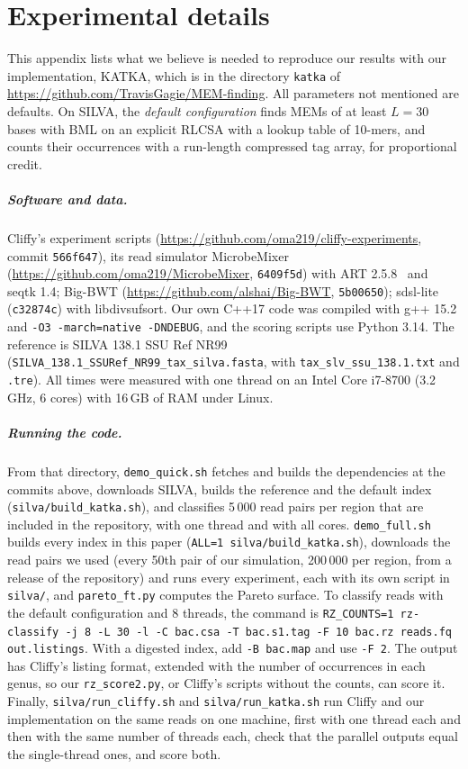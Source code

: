 \section{Experimental details}
\label{app:details}

This appendix lists what we believe is needed to reproduce our results with our implementation, KATKA, which is in the directory \texttt{katka} of \url{https://github.com/TravisGagie/MEM-finding}.
All parameters not mentioned are defaults.
On SILVA, the \emph{default configuration} finds MEMs of at least $L = 30$ bases with BML on an explicit RLCSA with a lookup table of 10-mers, and counts their occurrences with a run-length compressed tag array, for proportional credit.

\subparagraph*{Software and data.}
Cliffy's experiment scripts (\url{https://github.com/oma219/cliffy-experiments}, commit \texttt{566f647}), its read simulator MicrobeMixer (\url{https://github.com/oma219/MicrobeMixer}, \texttt{6409f5d}) with ART 2.5.8~\cite{HLMM12} and seqtk 1.4; Big-BWT (\url{https://github.com/alshai/Big-BWT}, \texttt{5b00650}); sdsl-lite (\texttt{c32874c}) with libdivsufsort.
Our own C++17 code was compiled with g++ 15.2 and \texttt{-O3 -march=native -DNDEBUG}, and the scoring scripts use Python 3.14.
The reference is SILVA 138.1 SSU Ref NR99 (\texttt{SILVA\_138.1\_SSURef\_NR99\_tax\_silva.fasta}, with \texttt{tax\_slv\_ssu\_138.1.txt} and \texttt{.tre}).
All times were measured with one thread on an Intel Core i7-8700 (3.2\,GHz, 6 cores) with 16\,GB of RAM under Linux.

\subparagraph*{Running the code.}
From that directory, \texttt{demo\_quick.sh} fetches and builds the dependencies at the commits above, downloads SILVA, builds the reference and the default index (\texttt{silva/build\_katka.sh}), and classifies 5\,000 read pairs per region that are included in the repository, with one thread and with all cores.
\texttt{demo\_full.sh} builds every index in this paper (\texttt{ALL=1 silva/build\_katka.sh}), downloads the read pairs we used (every 50th pair of our simulation, 200\,000 per region, from a release of the repository) and runs every experiment, each with its own script in \texttt{silva/}, and \texttt{pareto\_ft.py} computes the Pareto surface.
To classify reads with the default configuration and 8 threads, the command is \texttt{RZ\_COUNTS=1 rz-classify -j 8 -L 30 -l -C bac.csa -T bac.s1.tag -F 10 bac.rz reads.fq out.listings}.
With a digested index, add \texttt{-B bac.map} and use \texttt{-F 2}.
The output has Cliffy's listing format, extended with the number of occurrences in each genus, so our \texttt{rz\_score2.py}, or Cliffy's scripts without the counts, can score it.
Finally, \texttt{silva/run\_cliffy.sh} and \texttt{silva/run\_katka.sh} run Cliffy and our implementation on the same reads on one machine, first with one thread each and then with the same number of threads each, check that the parallel outputs equal the single-thread ones, and score both.

